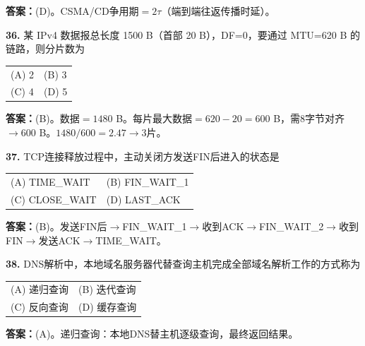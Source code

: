 \ifshowsolutions\par\noindent\textbf{答案：}(D)。CSMA/CD争用期$=2\tau$（端到端往返传播时延）。\else \answerarea \fi

\vspace{6pt}

\noindent\textbf{36.} 某 IPv4 数据报总长度 1500 B（首部 20 B），DF=0，要通过 MTU=620 B 的链路，则分片数为
\begin{center}
\begin{tabular}{ll}
(A) 2 & (B) 3 \\[6pt]
(C) 4 & (D) 5
\end{tabular}
\end{center}

\ifshowsolutions\par\noindent\textbf{答案：}(B)。数据$=1480$ B。每片最大数据$=620-20=600$ B，需8字节对齐$\to 600$ B。$1480/600=2.47\to 3$片。\else \answerarea \fi

\vspace{6pt}

\noindent\textbf{37.} TCP连接释放过程中，主动关闭方发送FIN后进入的状态是
\begin{center}
\begin{tabular}{ll}
(A) TIME\_WAIT & (B) FIN\_WAIT\_1 \\[6pt]
(C) CLOSE\_WAIT & (D) LAST\_ACK
\end{tabular}
\end{center}

\ifshowsolutions\par\noindent\textbf{答案：}(B)。发送FIN后$\to$FIN\_WAIT\_1$\to$收到ACK$\to$FIN\_WAIT\_2$\to$收到FIN$\to$发送ACK$\to$TIME\_WAIT。\else \answerarea \fi

\vspace{6pt}

\noindent\textbf{38.} DNS解析中，本地域名服务器代替查询主机完成全部域名解析工作的方式称为
\begin{center}
\begin{tabular}{ll}
(A) 递归查询 & (B) 迭代查询 \\[6pt]
(C) 反向查询 & (D) 缓存查询
\end{tabular}
\end{center}

\ifshowsolutions\par\noindent\textbf{答案：}(A)。递归查询：本地DNS替主机逐级查询，最终返回结果。\else \answerarea \fi

\vspace{6pt}

